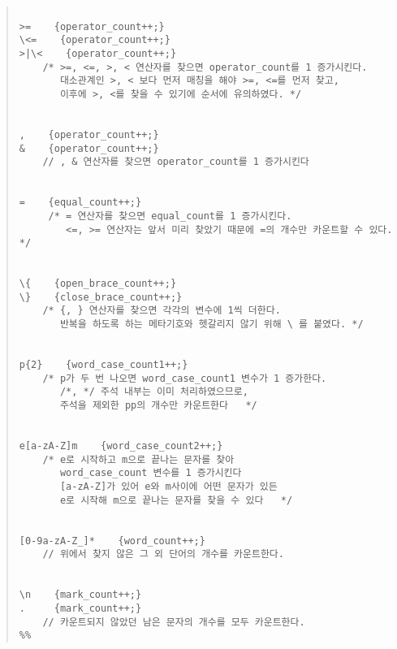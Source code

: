 \documentclass{article}
\begin{document}
\begin{quote}
\begin{verbatim}
  
>=    {operator_count++;}
\<=    {operator_count++;}
>|\<	{operator_count++;}
    /* >=, <=, >, < 연산자를 찾으면 operator_count를 1 증가시킨다. 
       대소관계인 >, < 보다 먼저 매칭을 해야 >=, <=를 먼저 찾고, 
       이후에 >, <를 찾을 수 있기에 순서에 유의하였다. */


,    {operator_count++;}
&    {operator_count++;}
    // , & 연산자를 찾으면 operator_count를 1 증가시킨다 
  
  
=    {equal_count++;}
     /* = 연산자를 찾으면 equal_count를 1 증가시킨다. 
        <=, >= 연산자는 앞서 미리 찾았기 때문에 =의 개수만 카운트할 수 있다. */

  
\{    {open_brace_count++;}
\}    {close_brace_count++;}
    /* {, } 연산자를 찾으면 각각의 변수에 1씩 더한다. 
       반복을 하도록 하는 메타기호와 헷갈리지 않기 위해 \ 를 붙였다. */

  
p{2}	{word_case_count1++;}
    /* p가 두 번 나오면 word_case_count1 변수가 1 증가한다. 
       /*, */ 주석 내부는 이미 처리하였으므로, 
       주석을 제외한 pp의 개수만 카운트한다   */

  
e[a-zA-Z]m    {word_case_count2++;}
    /* e로 시작하고 m으로 끝나는 문자를 찾아
       word_case_count 변수를 1 증가시킨다 
       [a-zA-Z]가 있어 e와 m사이에 어떤 문자가 있든 
       e로 시작해 m으로 끝나는 문자를 찾을 수 있다   */

  
[0-9a-zA-Z_]*    {word_count++;}
    // 위에서 찾지 않은 그 외 단어의 개수를 카운트한다. 


\n    {mark_count++;}
.     {mark_count++;}
    // 카운트되지 않았던 남은 문자의 개수를 모두 카운트한다.
%%

\end{verbatim}
\end{quote}
\end{document}
